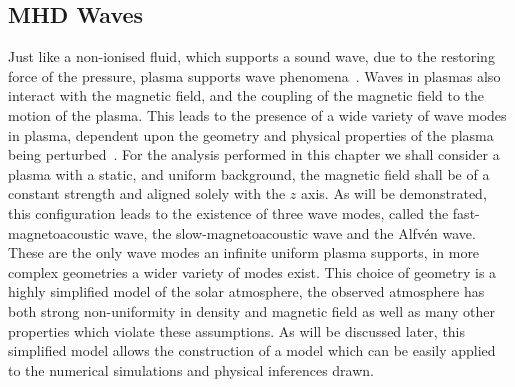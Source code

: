 \documentclass[a4paper,12pt,fourier,authoryear,custommargin]{Classes/PhDThesisPSnPDF}
\begin{document}
\subsection{MHD Waves}\label{sec:MHDwaves}
Just like a non-ionised fluid, which supports a sound wave, due to the restoring force of the pressure, plasma supports wave phenomena~\citep{alfven1942}.
Waves in plasmas also interact with the magnetic field, and the coupling of the magnetic field to the motion of the plasma.
This leads to the presence of a wide variety of wave modes in plasma, dependent upon the geometry and physical properties of the plasma being perturbed~\citep{jess2015}.
For the analysis performed in this chapter we shall consider a plasma with a static, and uniform background, the magnetic field shall be of a constant strength and aligned solely with the $z$ axis.
As will be demonstrated, this configuration leads to the existence of three wave modes, called the fast-magnetoacoustic wave, the slow-magnetoacoustic wave and the Alfv\'en wave.
These are the only wave modes an infinite uniform plasma supports, in more complex geometries a wider variety of modes exist.
This choice of geometry is a highly simplified model of the solar atmosphere, the observed atmosphere has both strong non-uniformity in density and magnetic field as well as many other properties which violate these assumptions.
As will be discussed later, this simplified model allows the construction of a model which can be easily applied to the numerical simulations and physical inferences drawn.
\end{document}
